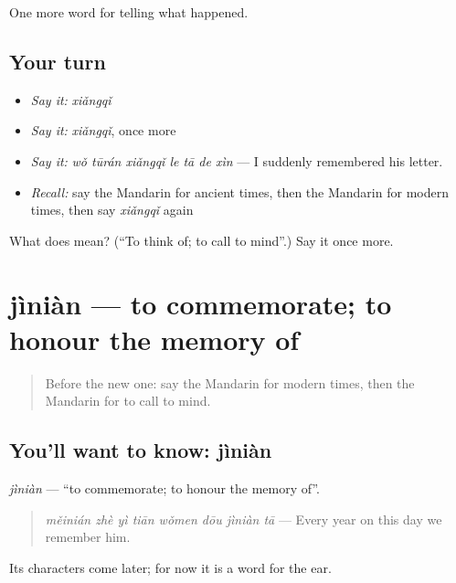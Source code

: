 \begin{grammarlens}[title={What you've built}]
One more word for telling what happened.
\end{grammarlens}

\subsection*{Your turn}
\begin{itemize}
\raggedright
  \item \emph{Say it:} \emph{xiǎngqǐ}
  \item \emph{Say it:} \emph{xiǎngqǐ}, once more
  \item \emph{Say it:} \emph{wǒ tūrán xiǎngqǐ le tā de xìn} — I suddenly remembered his letter.
  \item \emph{Recall:} say the Mandarin for ancient times, then the Mandarin for modern times, then say \emph{xiǎngqǐ} again
\end{itemize}

\begin{tcolorbox}[breakable,colback=teal!4,colframe=teal!35!black,title={Before you move on}]
What does  mean? (\textquotedblleft{}To think of; to call to mind\textquotedblright{}.) Say it once more.
\end{tcolorbox}
\section[jìniàn]{jìniàn — to commemorate; to honour the memory of}

\label{lesson:ZH-C324-jinian}



\begin{quote}
Before the new one: say the Mandarin for modern times, then the Mandarin for to call to mind.
\end{quote}

\subsection*{You'll want to know: jìniàn}
\emph{jìniàn} — \textquotedblleft{}to commemorate; to honour the memory of\textquotedblright{}.

\begin{quote}
\emph{měinián zhè yì tiān wǒmen dōu jìniàn tā} — Every year on this day we remember him.
\end{quote}

Its characters come later; for now it is a word for the ear.

